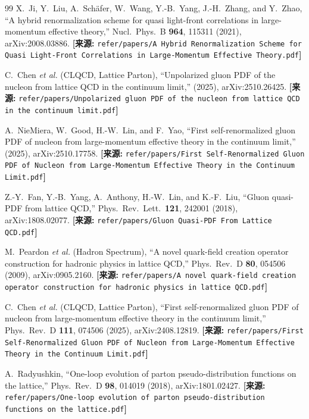 \documentclass[12pt,a4paper]{ctexart}
\theoremstyle{definition}
\begin{document}
\begin{thebibliography}{99}
X.~Ji, Y.~Liu, A.~Sch\"afer, W.~Wang, Y.-B.~Yang, J.-H.~Zhang, and Y.~Zhao,
``A hybrid renormalization scheme for quasi light-front correlations in large-momentum effective theory,''
Nucl.\ Phys.\ B \textbf{964}, 115311 (2021), arXiv:2008.03886.
\quad\textbf{[来源:} \texttt{refer/papers/A Hybrid Renormalization Scheme for Quasi Light-Front Correlations in Large-Momentum Effective Theory.pdf}\textbf{]}

C.~Chen \textit{et al.} (CLQCD, Lattice Parton),
``Unpolarized gluon PDF of the nucleon from lattice QCD in the continuum limit,''
(2025), arXiv:2510.26425.
\quad\textbf{[来源:} \texttt{refer/papers/Unpolarized gluon PDF of the nucleon from lattice QCD in the continuum limit.pdf}\textbf{]}

A.~NieMiera, W.~Good, H.-W.~Lin, and F.~Yao,
``First self-renormalized gluon PDF of nucleon from large-momentum effective theory in the continuum limit,''
(2025), arXiv:2510.17758.
\quad\textbf{[来源:} \texttt{refer/papers/First Self-Renormalized Gluon PDF of Nucleon from Large-Momentum Effective Theory in the Continuum Limit.pdf}\textbf{]}

Z.-Y.~Fan, Y.-B.~Yang, A.~Anthony, H.-W.~Lin, and K.-F.~Liu,
``Gluon quasi-PDF from lattice QCD,''
Phys.\ Rev.\ Lett.\ \textbf{121}, 242001 (2018), arXiv:1808.02077.
\quad\textbf{[来源:} \texttt{refer/papers/Gluon Quasi-PDF From Lattice QCD.pdf}\textbf{]}

M.~Peardon \textit{et al.} (Hadron Spectrum),
``A novel quark-field creation operator construction for hadronic physics in lattice QCD,''
Phys.\ Rev.\ D \textbf{80}, 054506 (2009), arXiv:0905.2160.
\quad\textbf{[来源:} \texttt{refer/papers/A novel quark-field creation operator construction for hadronic physics in lattice QCD.pdf}\textbf{]}

C.~Chen \textit{et al.} (CLQCD, Lattice Parton),
``First self-renormalized gluon PDF of nucleon from large-momentum effective theory in the continuum limit,''
Phys.\ Rev.\ D \textbf{111}, 074506 (2025), arXiv:2408.12819.
\quad\textbf{[来源:} \texttt{refer/papers/First Self-Renormalized Gluon PDF of Nucleon from Large-Momentum Effective Theory in the Continuum Limit.pdf}\textbf{]}

A.~Radyushkin,
``One-loop evolution of parton pseudo-distribution functions on the lattice,''
Phys.\ Rev.\ D \textbf{98}, 014019 (2018), arXiv:1801.02427.
\quad\textbf{[来源:} \texttt{refer/papers/One-loop evolution of parton pseudo-distribution functions on the lattice.pdf}\textbf{]}


\end{thebibliography}
\end{document}
